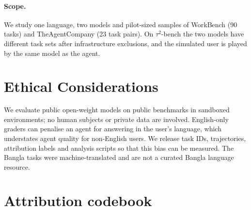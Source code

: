 \documentclass[11pt]{article}
\newcommand{\WB}{WorkBench}
\newcommand{\TAU}{$\tau^2$-bench}
\newcommand{\TAC}{TheAgentCompany}
\begin{document}
\paragraph{Scope.} We study one language, two models and pilot-sized samples of \WB{} (90 tasks)
and \TAC{} (23 task pairs). On \TAU{} the two models have different task sets after infrastructure
exclusions, and the simulated user is played by the same model as the agent.

\section*{Ethical Considerations}
We evaluate public open-weight models on public benchmarks in sandboxed environments; no human
subjects or private data are involved. English-only graders can penalise an agent for answering in
the user's language, which understates agent quality for non-English users. We release task IDs,
trajectories, attribution labels and analysis scripts so that this bias can be measured. The
Bangla tasks were machine-translated and are not a curated Bangla language resource.



\appendix

\section{Attribution codebook}
\label{app:codebook}
\end{document}
